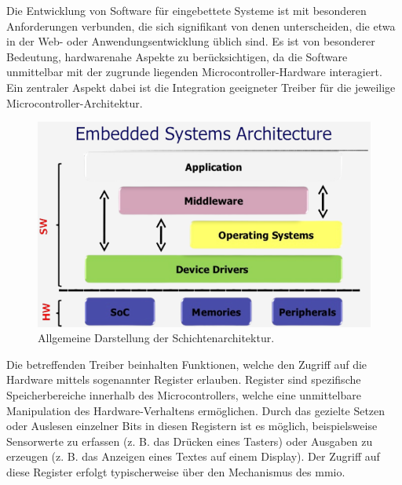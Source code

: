 %

Die Entwicklung von Software für eingebettete Systeme ist mit besonderen Anforderungen verbunden, die sich signifikant von denen unterscheiden, die etwa in der Web- oder Anwendungsentwicklung üblich sind.
Es ist von besonderer Bedeutung, hardwarenahe Aspekte zu berücksichtigen, da die Software unmittelbar mit der zugrunde liegenden Microcontroller-Hardware interagiert.
Ein zentraler Aspekt dabei ist die Integration geeigneter Treiber für die jeweilige Microcontroller-Architektur.
\begin{figure}[H]
	\includegraphics[width=\textwidth]{Pics/embedded_layer_architecture.png}
	\caption{Allgemeine Darstellung der Schichtenarchitektur.\cite{RichardsFord2020}}
	\label{fig:embedded_layer_architecture}
\end{figure}
Die betreffenden Treiber beinhalten Funktionen, welche den Zugriff auf die Hardware mittels sogenannter Register erlauben.
Register sind spezifische Speicherbereiche innerhalb des Microcontrollers, welche eine unmittelbare Manipulation des Hardware-Verhaltens ermöglichen.
Durch das gezielte Setzen oder Auslesen einzelner Bits in diesen Registern ist es möglich, beispielsweise Sensorwerte zu erfassen (z. B. das Drücken eines Tasters) oder Ausgaben zu erzeugen (z. B. das Anzeigen eines Textes auf einem Display).
Der Zugriff auf diese Register erfolgt typischerweise über den Mechanismus des \gls{mmio}. 
